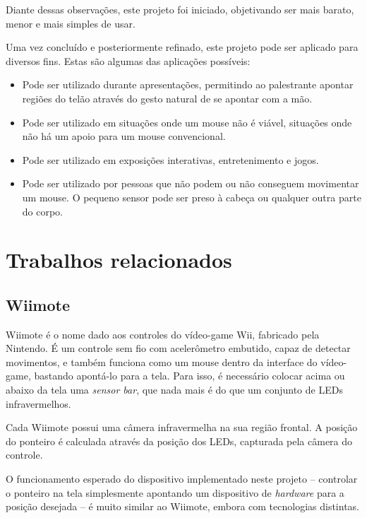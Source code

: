 \documentclass[brazil,pagestart=firstchapter]{abnt}
\begin{document}
Diante dessas observações, este projeto foi iniciado, objetivando ser mais
barato, menor e mais simples de usar.

Uma vez concluído e posteriormente refinado, este projeto pode ser aplicado
para diversos fins. Estas são algumas das aplicações possíveis:

\begin{itemize}
\item Pode ser utilizado durante apresentações, permitindo ao palestrante
apontar regiões do telão através do gesto natural de se apontar com a mão.
\item Pode ser utilizado em situações onde um mouse não é viável, situações
onde não há um apoio para um mouse convencional.
\item Pode ser utilizado em exposições interativas, entretenimento e jogos.
\item Pode ser utilizado por pessoas que não podem ou não conseguem
movimentar um mouse. O pequeno sensor pode ser preso à cabeça ou qualquer
outra parte do corpo.
\end{itemize}


\section{Trabalhos relacionados}
\label{sec:trabalhos_relacionados}


\subsection{Wiimote}
\label{sub:wiimote}

Wiimote é o nome dado aos controles do vídeo-game Wii, fabricado pela
Nintendo. É um controle sem fio com acelerômetro embutido, capaz de detectar
movimentos, e também funciona como um mouse dentro da interface do
vídeo-game, bastando apontá-lo para a tela. Para isso, é necessário colocar
acima ou abaixo da tela uma \textit{sensor bar}, que nada mais é do que um
conjunto de \acsp{LED} infravermelhos. \cite{WikipediaWiimote}

Cada Wiimote possui uma câmera infravermelha na sua região frontal. A
posição do ponteiro é calculada através da posição dos \acsp{LED}, capturada
pela câmera do controle.

O funcionamento esperado do dispositivo implementado neste projeto --
controlar o ponteiro na tela simplesmente apontando um dispositivo de
\textit{hardware} para a posição desejada -- é muito similar ao Wiimote,
embora com tecnologias distintas.
\end{document}
